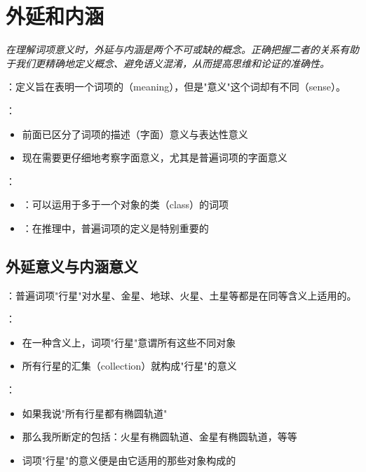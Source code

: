 \section{外延和内涵}

\begin{logicbox}[title=引言]
\textit{在理解词项意义时，外延与内涵是两个不可或缺的概念。正确把握二者的关系有助于我们更精确地定义概念、避免语义混淆，从而提高思维和论证的准确性。}
\end{logicbox}

\begin{theorembox}[title=意义概念的复杂性]
：定义旨在表明一个词项的（meaning），但是"意义"这个词却有不同（sense）。

：
\begin{itemize}
  \item 前面已区分了词项的描述（字面）意义与表达性意义
  \item 现在需要更仔细地考察字面意义，尤其是普遍词项的字面意义
\end{itemize}

：
\begin{itemize}
  \item {}：可以运用于多于一个对象的类（class）的词项
  \item {}：在推理中，普遍词项的定义是特别重要的
\end{itemize}
\end{theorembox}

\subsection{外延意义与内涵意义}

\begin{examplebox}[title="行星"的外延意义分析]
：普遍词项"行星"对水星、金星、地球、火星、土星等都是在同等含义上适用的。

：
\begin{itemize}
  \item 在一种含义上，词项"行星"意谓所有这些不同对象
  \item 所有行星的汇集（collection）就构成"行星"的意义
\end{itemize}

：
\begin{itemize}
  \item 如果我说"所有行星都有椭圆轨道"
  \item 那么我所断定的包括：火星有椭圆轨道、金星有椭圆轨道，等等
  \item 词项"行星"的意义便是由它适用的那些对象构成的
\end{itemize}
\end{examplebox}

